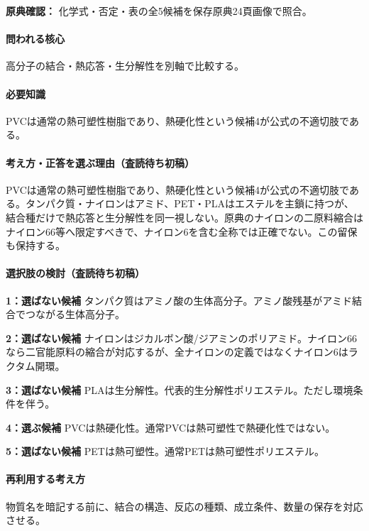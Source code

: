 \noindent\textbf{原典確認：} 化学式・否定・表の全5候補を保存原典24頁画像で照合。\par

\paragraph{問われる核心} 高分子の結合・熱応答・生分解性を別軸で比較する。

\paragraph{必要知識} PVCは通常の熱可塑性樹脂であり、熱硬化性という候補4が公式の不適切肢である。

\paragraph{考え方・正答を選ぶ理由（査読待ち初稿）} PVCは通常の熱可塑性樹脂であり、熱硬化性という候補4が公式の不適切肢である。タンパク質・ナイロンはアミド、PET・PLAはエステルを主鎖に持つが、結合種だけで熱応答と生分解性を同一視しない。原典のナイロンの二原料縮合はナイロン66等へ限定すべきで、ナイロン6を含む全称では正確でない。この留保も保持する。

\paragraph{選択肢の検討（査読待ち初稿）}\mbox{}\par

\noindent\textbf{1：選ばない候補} タンパク質はアミノ酸の生体高分子。アミノ酸残基がアミド結合でつながる生体高分子。\par

\noindent\textbf{2：選ばない候補} ナイロンはジカルボン酸/ジアミンのポリアミド。ナイロン66なら二官能原料の縮合が対応するが、全ナイロンの定義ではなくナイロン6はラクタム開環。\par

\noindent\textbf{3：選ばない候補} PLAは生分解性。代表的生分解性ポリエステル。ただし環境条件を伴う。\par

\noindent\textbf{4：選ぶ候補} PVCは熱硬化性。通常PVCは熱可塑性で熱硬化性ではない。\par

\noindent\textbf{5：選ばない候補} PETは熱可塑性。通常PETは熱可塑性ポリエステル。\par

\paragraph{再利用する考え方} 物質名を暗記する前に、結合の構造、反応の種類、成立条件、数量の保存を対応させる。


